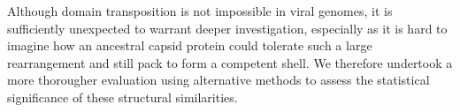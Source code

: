 \documentclass[12pt]{article}
\newcommand{\3}{$3_{10}$}
\begin{document}
Although domain transposition is not impossible in viral genomes,  it is sufficiently
unexpected to warrant deeper investigation, especially as it is hard to imagine how an ancestral
capsid protein could tolerate such a large rearrangement and still pack to form a competent shell.
We therefore undertook a more thorougher evaluation using alternative methods to assess the statistical 
significance of these structural similarities.

%
% 
% 
\end{document}

